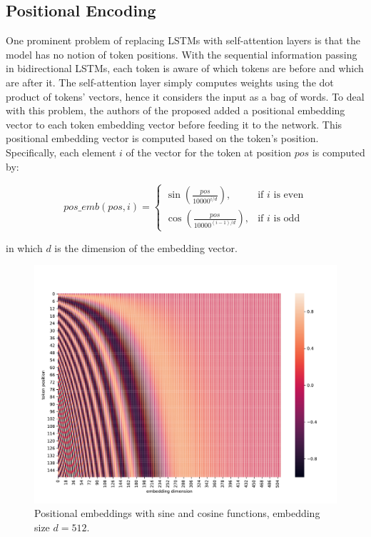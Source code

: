 \subsection{Positional Encoding}
\label{lit-trans-pos}

One prominent problem of replacing LSTMs with self-attention layers is that the model has no notion of token positions.
With the sequential information passing in bidirectional LSTMs, each token is aware of which tokens are before and which are after it.
The self-attention layer simply computes weights using the dot product of tokens' vectors, hence it considers the input as a bag of words.
To deal with this problem, the authors of the \transformer proposed added a positional embedding vector to each token embedding vector before feeding it to the network.
This positional embedding vector is computed based on the token's position. Specifically, each element $i$ of the vector for the token at position $pos$ is computed by:

\begin{equation}
    pos\_emb(pos, i) = \begin{cases} \sin\left(\frac{pos}{10000^{i/d}}\right), & \mbox{if } i\mbox{ is even} \\ \cos\left(\frac{pos}{10000^{(i-1)/d}}\right), & \mbox{if } i\mbox{ is odd} \end{cases}
\end{equation}

in which $d$ is the dimension of the embedding vector.

\begin{figure}
    \centering
    \includegraphics[width=\linewidth]{img/positional-embedding.pdf}
    \caption{Positional embeddings with sine and cosine functions, embedding size $d=512$.}
    \label{fig:positional-embedding}
\end{figure}

